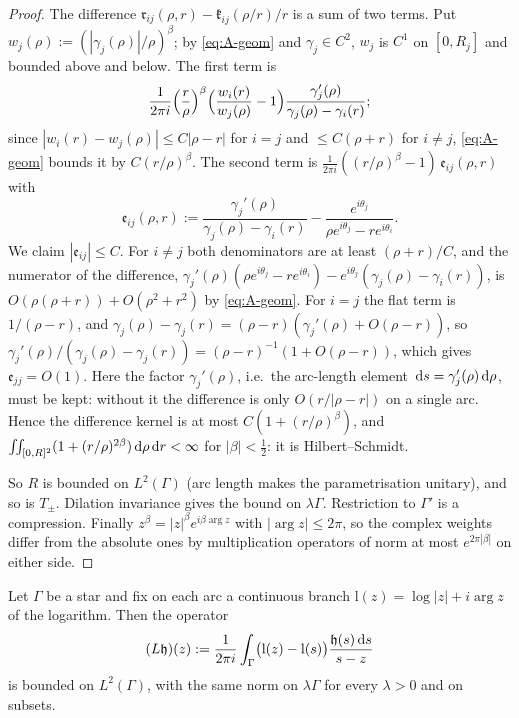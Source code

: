 \begin{proof}
The difference $\mathfrak r_{ij}(\rho,r)-\mathfrak k_{ij}(\rho/r)/r$ is a sum of two terms. Put
$w_j(\rho):=(|\gamma_j(\rho)|/\rho)^\beta$; by \eqref{eq:A-geom} and $\gamma_j\in C^2$, $w_j$ is $C^1$ on $[0,R_j]$ and
bounded above and below. The first term is
\[
  \frac1{2\pi i}\Bigl(\frac r\rho\Bigr)^\beta\Bigl(\frac{w_i(r)}{w_j(\rho)}-1\Bigr)\frac{\gamma_j'(\rho)}{\gamma_j(\rho)-\gamma_i(r)};
\]
since $|w_i(r)-w_j(\rho)|\le C|\rho-r|$ for $i=j$ and $\le C(\rho+r)$ for $i\ne j$, \eqref{eq:A-geom} bounds it by
$C(r/\rho)^\beta$. The second term is $\frac1{2\pi i}((r/\rho)^\beta-1)\,\mathfrak e_{ij}(\rho,r)$ with
\[
  \mathfrak e_{ij}(\rho,r):=\frac{\gamma_j'(\rho)}{\gamma_j(\rho)-\gamma_i(r)}-\frac{e^{i\theta_j}}{\rho e^{i\theta_j}-re^{i\theta_i}} .
\]
We claim $|\mathfrak e_{ij}|\le C$. For $i\ne j$ both denominators are at least $(\rho+r)/C$, and the numerator of the
difference, $\gamma_j'(\rho)(\rho e^{i\theta_j}-re^{i\theta_i})-e^{i\theta_j}(\gamma_j(\rho)-\gamma_i(r))$, is
$O(\rho(\rho+r))+O(\rho^2+r^2)$ by \eqref{eq:A-geom}. For $i=j$ the flat term is $1/(\rho-r)$, and
$\gamma_j(\rho)-\gamma_j(r)=(\rho-r)(\gamma_j'(\rho)+O(\rho-r))$, so $\gamma_j'(\rho)/(\gamma_j(\rho)-\gamma_j(r))=
(\rho-r)^{-1}(1+O(\rho-r))$, which gives $\mathfrak e_{jj}=O(1)$. Here the factor $\gamma_j'(\rho)$, i.e.\ the arc-length
element $\,\mathrm{d} s=\gamma_j'(\rho)\,\mathrm{d}\rho$, must be kept: without it the difference is only $O(r/|\rho-r|)$ on a single
arc. Hence the difference kernel is at most $C(1+(r/\rho)^\beta)$, and
$\iint_{[0,R]^2}(1+(r/\rho)^{2\beta})\,\mathrm{d}\rho\,\mathrm{d} r<\infty$ for $|\beta|<\frac12$: it is Hilbert--Schmidt.

So $R$ is bounded on $L^2(\Gamma)$ (arc length makes the parametrisation unitary), and so is $T_\pm$. Dilation invariance
gives the bound on $\lambda\Gamma$. Restriction to $\Gamma'$ is a compression. Finally $z^\beta=|z|^\beta e^{i\beta\arg z}$
with $|\arg z|\le2\pi$, so the complex weights differ from the absolute ones by multiplication operators of norm at most
$e^{2\pi|\beta|}$ on either side.
\end{proof}

\begin{lemma}\label{lem:A-log}
Let $\Gamma$ be a star and fix on each arc a continuous branch $\mathrm{l}(z)=\log|z|+i\arg z$ of the logarithm. Then the
operator
\[
  (L\mathfrak h)(z):=\frac1{2\pi i}\int_\Gamma\bigl(\mathrm l(z)-\mathrm l(s)\bigr)\frac{\mathfrak h(s)\,\mathrm{d} s}{s-z}
\]
is bounded on $L^2(\Gamma)$, with the same norm on $\lambda\Gamma$ for every $\lambda>0$ and on subsets.
\end{lemma}

